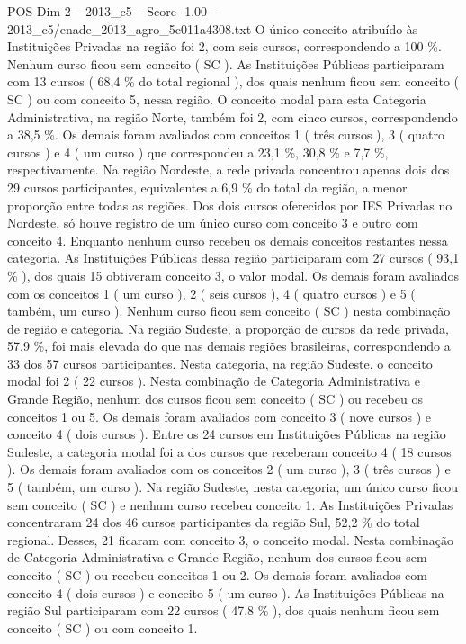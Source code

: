 \begin{textsample}{POS Dim 2 – 2013\_c5 – Score -1.00 – 2013\_c5/enade\_2013\_agro\_5c011a4308.txt}
O único conceito atribuído às Instituições Privadas na região foi 2, com seis cursos, correspondendo a 100 \%.
Nenhum curso ficou sem conceito ( SC ).
As Instituições Públicas participaram com 13 cursos ( 68,4 \% do total regional ), dos quais nenhum ficou sem conceito ( SC ) ou com conceito 5, nessa região.
O conceito modal para esta Categoria Administrativa, na região Norte, também foi 2, com cinco cursos, correspondendo a 38,5 \%.
Os demais foram avaliados com conceitos 1 ( três cursos ), 3 ( quatro cursos ) e 4 ( um curso ) que correspondeu a 23,1 \%, 30,8 \% e 7,7 \%, respectivamente.
Na região Nordeste, a rede privada concentrou apenas dois dos 29 cursos participantes, equivalentes a 6,9 \% do total da região, a menor proporção entre todas as regiões.
Dos dois cursos oferecidos por IES Privadas no Nordeste, só houve registro de um único curso com conceito 3 e outro com conceito 4.
Enquanto nenhum curso recebeu os demais conceitos restantes nessa categoria.
As Instituições Públicas dessa região participaram com 27 cursos ( 93,1 \% ), dos quais 15 obtiveram conceito 3, o valor modal.
Os demais foram avaliados com os conceitos 1 ( um curso ), 2 ( seis cursos ), 4 ( quatro cursos ) e 5 ( também, um curso ).
Nenhum curso ficou sem conceito ( SC ) nesta combinação de região e categoria.
Na região Sudeste, a proporção de cursos da rede privada, 57,9 \%, foi mais elevada do que nas demais regiões brasileiras, correspondendo a 33 dos 57 cursos participantes.
Nesta categoria, na região Sudeste, o conceito modal foi 2 ( 22 cursos ).
Nesta combinação de Categoria Administrativa e Grande Região, nenhum dos cursos ficou sem conceito ( SC ) ou recebeu os conceitos 1 ou 5.
Os demais foram avaliados com conceito 3 ( nove cursos ) e conceito 4 ( dois cursos ).
Entre os 24 cursos em Instituições Públicas na região Sudeste, a categoria modal foi a dos cursos que receberam conceito 4 ( 18 cursos ).
Os demais foram avaliados com os conceitos 2 ( um curso ), 3 ( três cursos ) e 5 ( também, um curso ).
Na região Sudeste, nesta categoria, um único curso ficou sem conceito ( SC ) e nenhum curso recebeu conceito 1.
As Instituições Privadas concentraram 24 dos 46 cursos participantes da região Sul, 52,2 \% do total regional.
Desses, 21 ficaram com conceito 3, o conceito modal.
Nesta combinação de Categoria Administrativa e Grande Região, nenhum dos cursos ficou sem conceito ( SC ) ou recebeu conceitos 1 ou 2.
Os demais foram avaliados com conceito 4 ( dois cursos ) e conceito 5 ( um curso ).
As Instituições Públicas na região Sul participaram com 22 cursos ( 47,8 \% ), dos quais nenhum ficou sem conceito ( SC ) ou com conceito 1.

\end{textsample}

